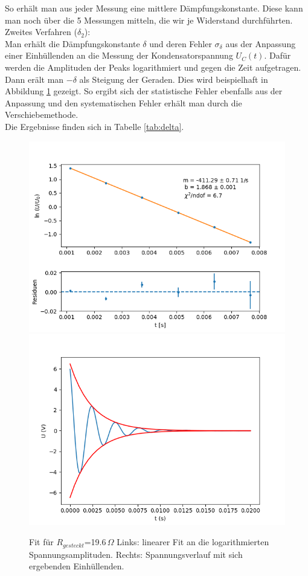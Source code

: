 \documentclass[12pt,a4paper]{article}
\begin{document}
So erhält man aus jeder Messung eine mittlere Dämpfungskonstante. Diese kann man noch über die 5 Messungen mitteln, die wir je Widerstand durchführten.\\

Zweites Verfahren ($\delta_2$):\\
Man erhält die Dämpfungskonstante $\delta$ und deren Fehler $\sigma_\delta$ aus der Anpassung einer Einhüllenden an die Messung der Kondensatorspannung $U_C(t)$. Dafür werden die Amplituden der Peaks logarithmiert und gegen die Zeit aufgetragen. Dann erält man $-\delta$ als Steigung der Geraden. Dies wird beispielhaft in Abbildung \ref{pic:delta_fit} gezeigt. So ergibt sich der statistische Fehler ebenfalls aus der Anpassung und den systematischen Fehler erhält man durch die Verschiebemethode. \\

Die Ergebnisse finden sich in Tabelle \ref{tab:delta}.
\begin{figure}
	\centering
	\includegraphics[width=0.48\linewidth]{Bilder/28,5Ohm_lin_fit}
	\includegraphics[width=0.48\linewidth]{Bilder/28,5Ohm_exp_fit}
	\caption{Fit für $R_{gesteckt}$=19.6\,$\Omega$ \qquad Links: linearer Fit an die logarithmierten Spannungsamplituden. \qquad Rechts: Spannungsverlauf mit sich ergebenden Einhüllenden.}
	\label{pic:delta_fit}
\end{figure}
\end{document}
